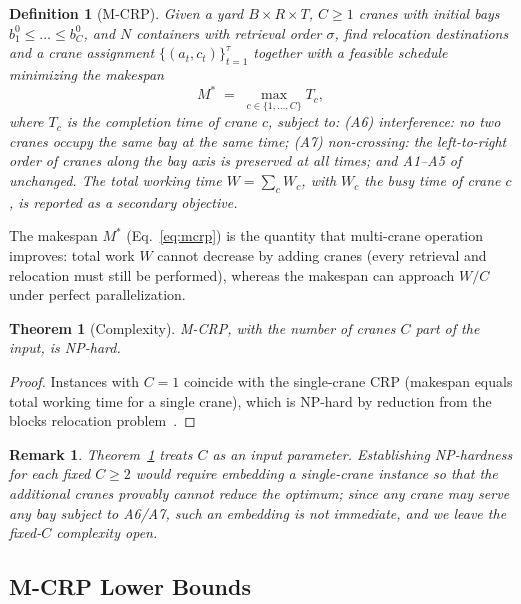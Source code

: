 \documentclass[11pt,a4paper]{elsarticle}
\newtheorem{definition}{Definition}[section]
\newtheorem{theorem}{Theorem}[section]
\newtheorem{remark}{Remark}[section]
\begin{document}
\begin{definition}[M-CRP]
\label{def:mcrp}
Given a yard $B \times R \times T$, $C \geq 1$ cranes with initial bays $b_1^0 \le \dots \le b_C^0$, and $N$ containers with retrieval order $\sigma$, find relocation destinations and a crane assignment $\{(a_t,c_t)\}_{t=1}^\tau$ together with a feasible schedule minimizing the \emph{makespan}
\begin{equation}
    M^\ast \;=\; \max_{c \in \{1,\dots,C\}} T_c,
    \label{eq:mcrp}
\end{equation}
where $T_c$ is the completion time of crane $c$, subject to:
\emph{(A6) interference:} no two cranes occupy the same bay at the same time;
\emph{(A7) non-crossing:} the left-to-right order of cranes along the bay axis is preserved at all times;
and A1--A5 of~\cite{shin2026} unchanged. The \emph{total working time} $W = \sum_{c} W_c$, with $W_c$ the busy time of crane $c$, is reported as a secondary objective.
\end{definition}

The makespan $M^\ast$ (Eq.~\ref{eq:mcrp}) is the quantity that multi-crane operation improves: total work $W$ cannot decrease by adding cranes (every retrieval and relocation must still be performed), whereas the makespan can approach $W/C$ under perfect parallelization.

\begin{theorem}[Complexity]
\label{thm:np}
M-CRP, with the number of cranes $C$ part of the input, is NP-hard.
\end{theorem}
\begin{proof}
Instances with $C=1$ coincide with the single-crane CRP (makespan equals total working time for a single crane), which is NP-hard by reduction from the blocks relocation problem~\cite{caserta2012,shin2026}.
\end{proof}

\begin{remark}
Theorem~\ref{thm:np} treats $C$ as an input parameter. Establishing NP-hardness for each \emph{fixed} $C \ge 2$ would require embedding a single-crane instance so that the additional cranes provably cannot reduce the optimum; since any crane may serve any bay subject to A6/A7, such an embedding is not immediate, and we leave the fixed-$C$ complexity open.
\end{remark}

\subsection{M-CRP Lower Bounds}
\label{sec:lb}
\end{document}
